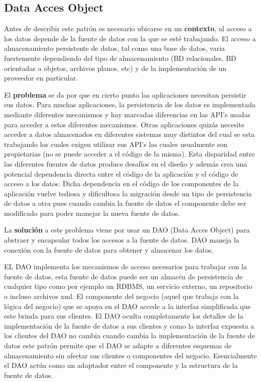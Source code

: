 \subsection{Data Acces Object}\label{jdbgm:dao}
Antes de describir este patrón es necesario ubicarse en un \textbf{contexto}, al acceso a los datos depende de la fuente de datos con la que se esté trabajando. El acceso a almacenamiento persistente de datos, tal como una base de datos, varia fuertemente dependiendo del tipo de almacenamiento (BD relacionales, BD orientadas a objetos, archivos planos, etc) y de la implementación de un proveedor en particular.

El \textbf{problema} se da por que en cierto punto las aplicaciones necesitan persistir sus datos. Para muchas aplicaciones, la persistencia de los datos es implementada mediante diferentes mecanismos y hay marcadas diferencias en las API's usadas para acceder a estos diferentes mecanismos. Otras aplicaciones quizás necesite acceder a datos almacenados en diferentes sistemas muy distintos del cual se esta trabajando los cuales exigen utilizar sus API's las cuales usualmente son propietarias (no se puede acceder a el código de la misma). Esta disparidad entre las diferentes fuentes de datos produce desafíos en el diseño y además crea una potencial dependencia directa entre el código de la aplicación y el código de acceso a los datos. Dicha dependencia en el código de los componentes de la aplicación vuelve tediosa y dificultosa la migración desde un tipo de persistencia de datos a otra pues cuando cambia la fuente de datos el componente debe ser modificado para poder manejar la nueva fuente de datos.

La \textbf{solución} a este problema viene por usar un DAO (Data Acces Object) para abstraer y encapsular todos los accesos a la fuente de datos. DAO maneja la conexión con la fuente de datos para obtener y almacenar los datos.

EL DAO implementa los mecanismos de acceso necesarios para trabajar con la fuente de datos, esta fuente de datos puede ser un almacén de persistencia de cualquier tipo como por ejemplo un RDBMS, un servicio externo, un repositorio o incluso archivos xml. El componente del negocio (aquel que trabaja con la lógica del negocio) que se apoya en el DAO accede a la interfaz simplificada que este brinda para sus clientes. El DAO oculta completamente los detalles de la implementación de la fuente de datos a sus clientes y como la interfaz expuesta a los clientes del DAO no cambia cuando cambia la implementación de la fuente de datos este patrón permite que el DAO se adapte a diferentes esquemas de almacenamiento sin afectar sus clientes o componentes del negocio. Esencialmente el DAO actúa como un adaptador entre el componente y la estructura de la fuente de datos.

